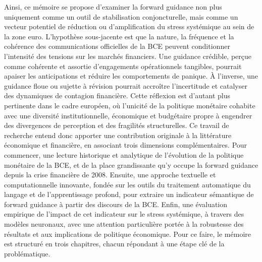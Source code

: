 Ainsi, ce mémoire se propose d’examiner la forward guidance non plus uniquement comme un outil de stabilisation conjoncturelle, mais comme un vecteur potentiel de réduction ou d’amplification du stress systémique au sein de la zone euro. L’hypothèse sous-jacente est que la nature, la fréquence et la cohérence des communications officielles de la BCE peuvent conditionner l’intensité des tensions sur les marchés financiers. Une guidance crédible, perçue comme cohérente et assortie d’engagements opérationnels tangibles, pourrait apaiser les anticipations et réduire les comportements de panique. À l’inverse, une guidance floue ou sujette à révision pourrait accroître l’incertitude et catalyser des dynamiques de contagion financière. Cette réflexion est d’autant plus pertinente dans le cadre européen, où l’unicité de la politique monétaire cohabite avec une diversité institutionnelle, économique et budgétaire propre à engendrer des divergences de perception et des fragilités structurelles. Ce travail de recherche entend donc apporter une contribution originale à la littérature économique et financière, en associant trois dimensions complémentaires. Pour commencer, une lecture historique et analytique de l’évolution de la politique monétaire de la BCE, et de la place grandissante qu’y occupe la forward guidance depuis la crise financière de 2008. Ensuite, une approche textuelle et computationnelle innovante, fondée sur les outils du traitement automatique du langage et de l’apprentissage profond, pour extraire un indicateur sémantique de forward guidance à partir des discours de la BCE. Enfin, une évaluation empirique de l’impact de cet indicateur sur le stress systémique, à travers des modèles neuronaux, avec une attention particulière portée à la robustesse des résultats et aux implications de politique économique. Pour ce faire, le mémoire est structuré en trois chapitres, chacun répondant à une étape clé de la problématique.\\

